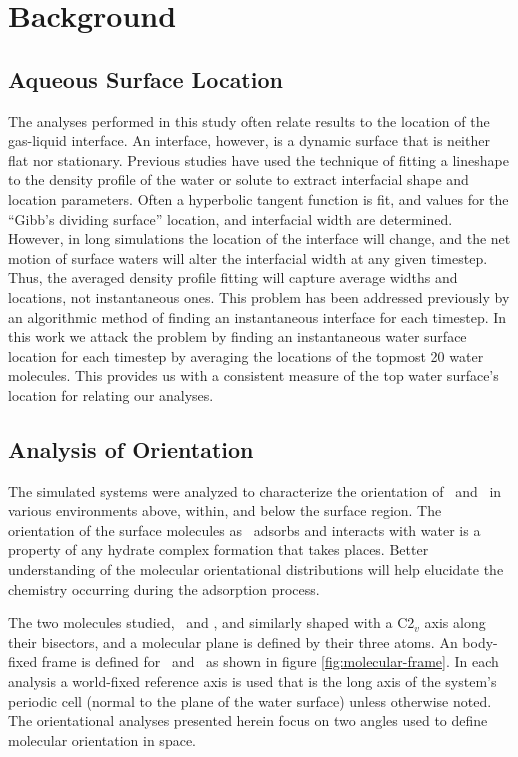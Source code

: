 \section{Background}

\subsection {Aqueous Surface Location}

	The analyses performed in this study often relate results to the location of the gas-liquid interface. An interface, however, is a dynamic surface that is neither flat nor stationary. Previous studies have used the technique of fitting a lineshape to the density profile of the water or solute to extract interfacial shape and location parameters.\cite{find something for this} Often a hyperbolic tangent function is fit, and values for the ``Gibb's dividing surface'' location, and interfacial width are determined.\cite{couple papers about the tangent function} However, in long simulations the location of the interface will change, and the net motion of surface waters will alter the interfacial width at any given timestep. Thus, the averaged density profile fitting will capture average widths and locations, not instantaneous ones. This problem has been addressed previously by an algorithmic method of finding an instantaneous interface for each timestep.\cite{the paper that addresses this} In this work we attack the problem by finding an instantaneous water surface location for each timestep by averaging the locations of the topmost 20 water molecules. This provides us with a consistent measure of the top water surface's location for relating our analyses.

\subsection{Analysis of Orientation}

	The simulated systems were analyzed to characterize the orientation of \wat~and \suldiox~in various environments above, within, and below the surface region. The orientation of the surface molecules as \suldiox~adsorbs and interacts with water is a property of any hydrate complex formation that takes places. Better understanding of the molecular orientational distributions will help elucidate the chemistry occurring during the adsorption process.

	The two molecules studied, \wat~and \suldiox, and similarly shaped with a C2$_v$ axis along their bisectors, and a molecular plane is defined by their three atoms. An body-fixed frame is defined for \wat~and \suldiox~as shown in figure \ref{fig:molecular-frame}. In each analysis a world-fixed reference axis is used that is the long axis of the system's periodic cell (normal to the plane of the water surface) unless otherwise noted. The orientational analyses presented herein focus on two angles used to define molecular orientation in space. 
	
